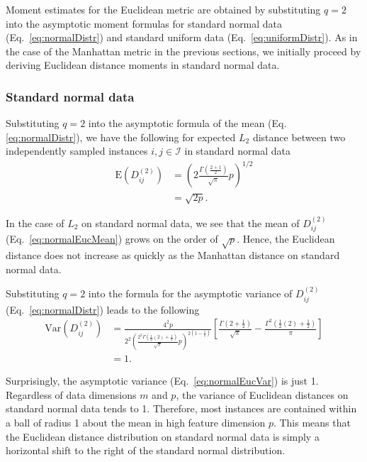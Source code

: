 \documentclass[10pt,letterpaper]{article}
\begin{document}
Moment estimates for the Euclidean metric are obtained by substituting $q=2$ into the asymptotic moment formulas for standard normal data (Eq.~\ref{eq:normalDistr}) and standard uniform data (Eq.~\ref{eq:uniformDistr}). As in the case of the Manhattan metric in the previous sections, we initially proceed by deriving Euclidean distance moments in standard normal data.

\subsubsection{Standard normal data}

Substituting $q=2$ into the asymptotic formula of the mean (Eq. \ref{eq:normalDistr}), we have the following for expected $L_2$ distance between two independently sampled instances $i,j \in \mathcal{I}$ in standard normal data
%
\begin{equation}\label{eq:normalEucMean}
\begin{aligned}
\text{E}\left(D^{(2)}_{ij}\right) &= \left(2\frac{\Gamma\left(\frac{2 + 1}{2}\right)}{\sqrt{\pi}}p\right)^{1/2} \\
&= \sqrt{2p}.
\end{aligned}
\end{equation}

In the case of $L_2$ on standard normal data, we see that the mean of $D^{(2)}_{ij}$ (Eq.~\ref{eq:normalEucMean}) grows on the order of $\sqrt{p}$. Hence, the Euclidean distance does not increase as quickly as the Manhattan distance on standard normal data.

Substituting $q=2$ into the formula for the asymptotic variance of $D^{(2)}_{ij}$ (Eq.~\ref{eq:normalDistr}) leads to the following
%
\begin{equation}\label{eq:normalEucVar}
\begin{aligned}
\text{Var}\left(D^{(2)}_{ij}\right) &= \frac{4^2p}{2^2\left(\frac{2^2\Gamma\left(\frac{1}{2}(2) + \frac{1}{2}\right)}{\sqrt{\pi}}p\right)^{2\left(1 - \frac{1}{2}\right)}}\left[\frac{\Gamma\left(2 + \frac{1}{2}\right)}{\sqrt{\pi}} - \frac{\Gamma^2\left(\frac{1}{2}(2) + \frac{1}{2}\right)}{\pi}\right] \\
&= 1.
\end{aligned}
\end{equation}

Surprisingly, the asymptotic variance (Eq.~\ref{eq:normalEucVar}) is just 1. Regardless of data dimensions $m$ and $p$, the variance of Euclidean distances on standard normal data tends to 1. Therefore, most instances are contained within a ball of radius 1 about the mean in high feature dimension $p$. This means that the Euclidean distance distribution on standard normal data is simply a horizontal shift to the right of the standard normal distribution.
\end{document}
